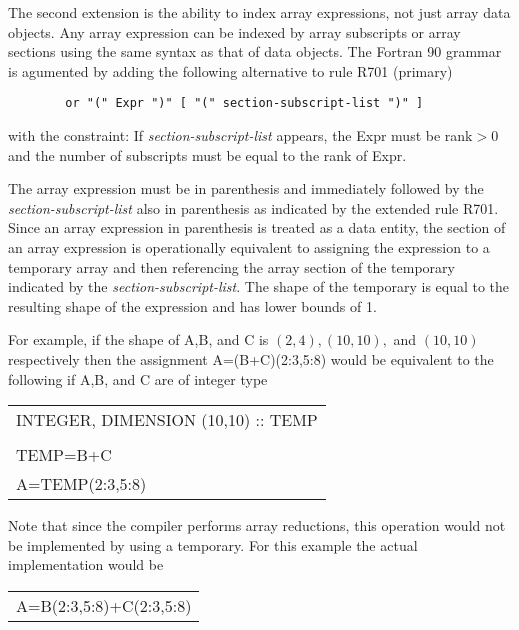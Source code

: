 The second extension is the ability to index array expressions, not
just array data objects.  Any array expression can be indexed by array
subscripts or array sections using the same syntax as that of data
objects.  The Fortran 90 grammar is agumented by adding the following 
alternative to rule R701 (primary)
\begin{verbatim}
        or "(" Expr ")" [ "(" section-subscript-list ")" ]
\end{verbatim}
with the constraint: If {\it section-subscript-list} appears, the Expr must
be rank$>0$ and the number of subscripts must be equal to the rank of Expr.

The array expression must be in parenthesis and
immediately followed by the {\it section-subscript-list} also in
parenthesis as indicated by the extended rule R701.  Since an array expression 
in parenthesis is treated as a data entity, the section of an array 
expression is operationally 
equivalent to assigning the expression to a temporary array and then 
referencing the array section of the temporary indicated by
the {\it section-subscript-list}.  The shape of the temporary is 
equal to the resulting shape of the expression and has lower bounds of 1.

For example, if the shape of A,B, and C is $(2,4),(10,10),$ and
$(10,10)$ respectively then the assignment \newline
A=(B+C)(2:3,5:8) \newline
would be equivalent to the following if A,B, and C are of integer type \newline
\begin{tabular}{l}
INTEGER, DIMENSION (10,10) :: TEMP \\
\\
TEMP=B+C \\
A=TEMP(2:3,5:8) \\
\end{tabular} \newline
Note that since the compiler performs array reductions, this operation
would not be implemented by using a temporary.  For this example the
actual implementation would be \newline
\begin{tabular}{l}
A=B(2:3,5:8)+C(2:3,5:8) \\
\end{tabular} \newline

